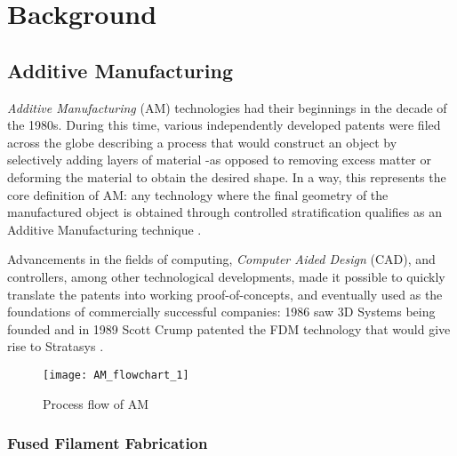\documentclass[main.tex]{subfiles}
\begin{document}
\chapter{Background}
\section{Additive Manufacturing}
\emph{Additive Manufacturing} (AM) technologies had their beginnings in the decade of the 1980s. During this time, various independently developed patents were filed across the globe describing a process that would construct an object by selectively adding layers of material -as opposed to removing excess matter or deforming the material to obtain the desired shape. In a way, this represents the core definition of AM: any technology where the final geometry of the manufactured object is obtained through controlled stratification qualifies as an Additive Manufacturing technique \cite{Gibson2015}.

Advancements in the fields of computing, \emph{Computer Aided Design} (CAD), and controllers, among other technological developments, made it possible to quickly translate the patents into working proof-of-concepts, and eventually used as the foundations of commercially successful companies: 1986 saw 3D Systems being founded and in 1989 Scott Crump patented the FDM technology that would give rise to Stratasys \cite{Gibson2015,3DSystems,Stratasys2017}.

\begin{figure}[h]
	\center
	\texttt{[image: AM\_flowchart\_1]}
	\caption{Process flow of AM}
\end{figure}
 
\subsection{Fused Filament Fabrication}
% 
%
\end{document}
